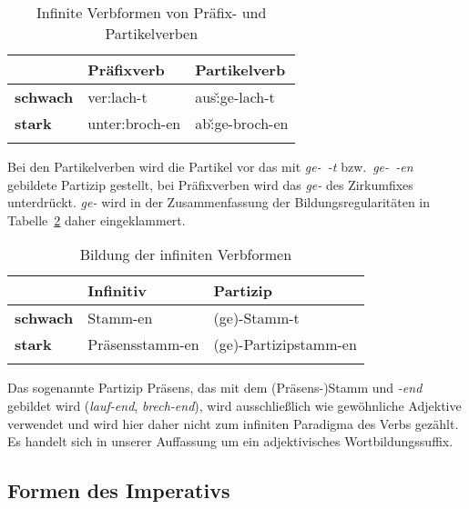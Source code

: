 \begin{table}
  \centering
  \begin{tabular}{lll}
    \lsptoprule
    & \textbf{Präfixverb} & \textbf{Partikelverb} \\
    \midrule
    \textbf{schwach} & ver:lach-t & aus\v:ge-lach-t \\
    \textbf{stark} & unter:broch-en & ab\v:ge-broch-en\\
    \lspbottomrule
  \end{tabular}
  \caption{Infinite Verbformen von Präfix- und Partikelverben}
  \label{tab:ppvpart}
\end{table}

Bei den Partikelverben wird die Partikel vor das mit \textit{ge-~-t} bzw.\ \textit{ge-~-en} gebildete Partizip gestellt, bei Präfixverben wird das \textit{ge-} des Zirkumfixes unterdrückt.
\textit{ge-} wird in der Zusammenfassung der Bildungsregularitäten in Tabelle~\ref{tab:vinf} daher eingeklammert.

\begin{table}
  \centering
  \begin{tabular}{lll}
    \lsptoprule
    & \textbf{Infinitiv} & \textbf{Partizip} \\
    \midrule
    \textbf{schwach} & Stamm-en & (ge)-Stamm-t\\
    \textbf{stark} & Präsensstamm-en & (ge)-Partizipstamm-en\\
    \lspbottomrule
  \end{tabular}
  \caption{Bildung der infiniten Verbformen}
  \label{tab:vinf}
\end{table}

Das sogenannte Partizip Präsens, das mit dem (Präsens-)Stamm und \textit{-end} gebildet wird (\textit{lauf-end}, \textit{brech-end}), wird ausschließlich wie gewöhnliche Adjektive verwendet und wird hier daher nicht zum infiniten Paradigma des Verbs gezählt.
Es handelt sich in unserer Auffassung um ein adjektivisches Wortbildungssuffix.

\subsection{Formen des Imperativs}

\label{sec:impflex}


